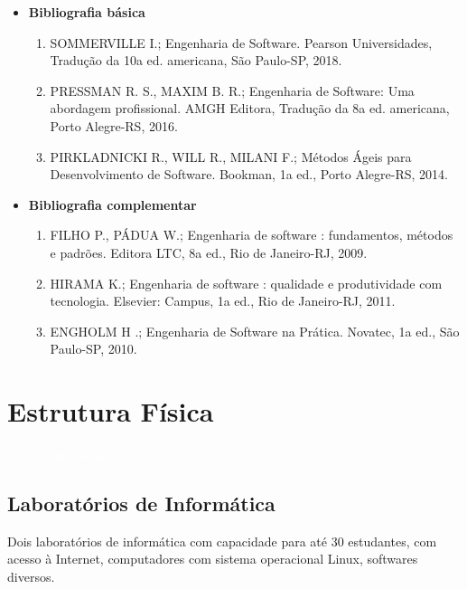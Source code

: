 \documentclass[11pt,fleqn]{book} %
\begin{document}
\begin{itemize}
	\item \textbf{Bibliografia básica}
	\begin{enumerate}
		\item SOMMERVILLE I.; Engenharia de Software. Pearson Universidades, Tradução da 10a ed. americana, São Paulo-SP, 2018.
		\item PRESSMAN R. S., MAXIM B. R.; Engenharia de Software: Uma abordagem profissional. AMGH Editora, Tradução da 8a ed. americana, Porto Alegre-RS, 2016.
		\item PIRKLADNICKI R., WILL R., MILANI F.; Métodos Ágeis para Desenvolvimento de Software. Bookman, 1a ed., Porto Alegre-RS, 2014.
	\end{enumerate}
	\item \textbf{Bibliografia complementar}
	\begin{enumerate}
		\item FILHO P., PÁDUA W.; Engenharia de software : fundamentos, métodos e padrões. Editora LTC, 8a ed., Rio de Janeiro-RJ, 2009.
		\item HIRAMA K.; Engenharia de software : qualidade e produtividade com tecnologia. Elsevier: Campus, 1a ed., Rio de Janeiro-RJ, 2011.
		\item ENGHOLM H .; Engenharia de Software na Prática. Novatec, 1a ed., São Paulo-SP, 2010.
	
	\end{enumerate} 	
	
\end{itemize}





\chapter{Estrutura Física}\label{estrutura}
\vspace{6em}
\begin{flushright}
	\textit{\textcolor{white}{Um bonita citação...}}
\end{flushright}
\vspace{12em}

\section{Laboratórios de Informática}
Dois laboratórios de informática com capacidade para até 30 estudantes, com acesso à Internet, computadores com sistema operacional Linux, softwares diversos.
\end{document}
